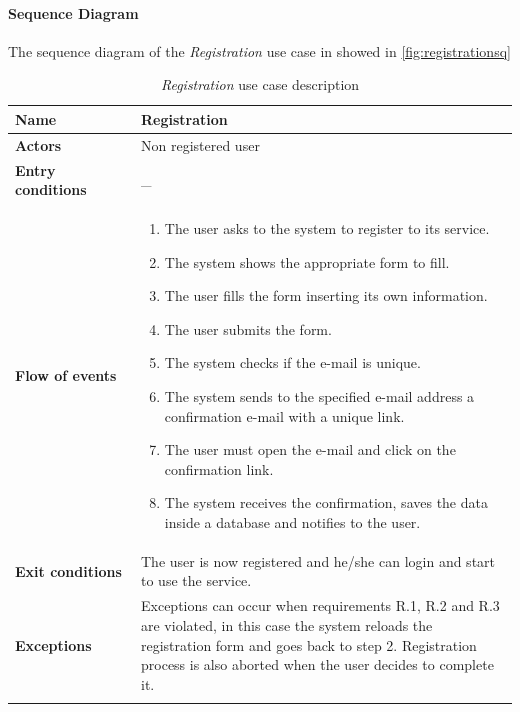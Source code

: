 \paragraph*{Sequence Diagram\\}
The sequence diagram of the \emph{Registration} use case in showed in \autoref{fig:registrationsq}
\newpage
\begin{longtable}{p{0.25\linewidth}|p{0.75\linewidth}}
	\hline
		\label{tab:registration}
	\textbf{Name} & \textbf{Registration} \\
	\hline
	\textbf{Actors} & Non registered user \\
	\hline
	\textbf{Entry conditions} & \_ \\
	\hline
	\textbf{Flow of events} & 
	\begin{enumerate}
		\item The user asks to the system to register to its service.
		\item The system shows the appropriate form to fill.
		\item The user fills the form inserting its own information.
		\item The user submits the form.
		\item The system checks if the e-mail is unique.
		\item The system sends to the specified e-mail address a confirmation e-mail with a unique link.
		\item The user must open the e-mail and click on the confirmation link.
		\item The system receives the confirmation, saves the data inside a database and notifies to the user.
	\end{enumerate}\\
	\hline
	\textbf{Exit conditions} & The user is now registered and he/she can login and start to use the service.\\
	\hline
	\textbf{Exceptions} & Exceptions can occur when requirements R.1, R.2 and R.3 are violated, in this case the system reloads the registration form and goes back to step 2. 
	Registration process is also aborted when the user decides to complete it. \\
	\hline
	\caption{\emph{Registration} use case description}
\end{longtable}


